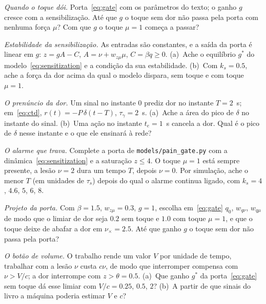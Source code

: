 \begin{exercise}[\lvlB]
\label{ex:14:2}
\emph{Quando o toque dói.} Porta~\eqref{eq:gate} com os parâmetros do texto; o ganho $g$ cresce com a sensibilização. Até que $g$ o toque sem dor não passa pela porta com nenhuma força $\mu$? Com que $g$ o toque $\mu=1$ começa a passar?
\end{exercise}

\begin{exercise}[\lvlB]
\label{ex:14:3}
\emph{Estabilidade da sensibilização.} As entradas são constantes, e a saída da porta é linear em $g$: $z=gA-C$, $A=\nu+w_{z\mu}\mu$, $C=\beta q\ge0$. (a)~Ache o equilíbrio $g^*$ do modelo~\eqref{eq:sensitization} e a condição da sua estabilidade. (b)~Com $k_s=0.5$, ache a força da dor acima da qual o modelo dispara, sem toque e com toque $\mu=1$.
\end{exercise}

\begin{exercise}[\lvlA]
\label{ex:14:4}
\emph{O prenúncio da dor.} Um sinal no instante $0$ prediz dor no instante $T=2$~s; em~\eqref{eq:ctd}, $r(t)=-P\,\delta(t-T)$, $\tau_\gamma=2$~s. (a)~Ache a área do pico de $\delta$ no instante do sinal. (b)~Uma ação no instante $t_e=1$~s cancela a dor. Qual é o pico de $\delta$ nesse instante e o que ele ensinará à rede?
\end{exercise}

\begin{exercise}[\lvlB]
\label{ex:14:5}
\emph{O alarme que trava.} Complete a porta de \texttt{models/\allowbreak pain\_gate.py} com a dinâmica~\eqref{eq:sensitization} e a saturação $z\le4$. O toque $\mu=1$ está sempre presente, a lesão $\nu=2$ dura um tempo $T$, depois $\nu=0$. Por simulação, ache o menor $T$ (em unidades de $\tau_s$) depois do qual o alarme continua ligado, com $k_s=4$, $4.6$, $5$, $6$, $8$.
\end{exercise}

\begin{exercise}[\lvlB]
\label{ex:14:6}
\emph{Projeto da porta.} Com $\beta=1.5$, $w_{z\mu}=0.3$, $g=1$, escolha em~\eqref{eq:gate} $q_0$, $w_{q\nu}$, $w_{q\mu}$ de modo que o limiar de dor seja $0.2$ sem toque e $1.0$ com toque $\mu=1$, e que o toque deixe de abafar a dor em $\nu_\times=2.5$. Até que ganho $g$ o toque sem dor não passa pela porta?
\end{exercise}

\begin{exercise}[\lvlC]
\label{ex:14:7}
\emph{O botão de volume.} O trabalho rende um valor $V$ por unidade de tempo, trabalhar com a lesão $\nu$ custa $c\nu$, de modo que interromper compensa com $\nu>V/c$; a dor interrompe com $z>\theta=0.5$. (a)~Que ganho $g^*$ da porta~\eqref{eq:gate} sem toque dá esse limiar com $V/c=0.25$, $0.5$, $2$? (b)~A partir de que sinais do livro a máquina poderia estimar $V$ e $c$?
\end{exercise}
